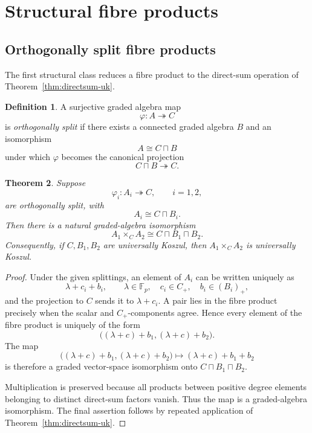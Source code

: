 \documentclass[12pt]{amsart}
\theoremstyle{plain}
\newtheorem{theorem}{Theorem}[section]
\theoremstyle{definition}
\newtheorem{definition}[theorem]{Definition}
\theoremstyle{remark}
\numberwithin{equation}{section}
\newcommand{\Fp}{\mathbb{F}_p}
\begin{document}
\section{Structural fibre products}
\label{sec:structural}

\subsection{Orthogonally split fibre products}

The first structural class reduces a fibre product to the direct-sum
operation of Theorem~\ref{thm:directsum-uk}.

\begin{definition}
\label{def:orthsplit}
A surjective graded algebra map
\[
\varphi:A\twoheadrightarrow C
\]
is \emph{orthogonally split} if there exists a connected graded algebra
\(B\) and an isomorphism
\[
A\cong C\sqcap B
\]
under which \(\varphi\) becomes the canonical projection
\[
C\sqcap B\twoheadrightarrow C.
\]
\end{definition}

\begin{theorem}
\label{thm:orthsplit}
Suppose
\[
\varphi_i:A_i\twoheadrightarrow C,\qquad i=1,2,
\]
are orthogonally split, with
\[
A_i\cong C\sqcap B_i.
\]
Then there is a natural graded-algebra isomorphism
\[
A_1\times_C A_2
\cong
C\sqcap B_1\sqcap B_2.
\]
Consequently, if \(C,B_1,B_2\) are universally Koszul, then
\(A_1\times_C A_2\) is universally Koszul.
\end{theorem}

\begin{proof}
Under the given splittings, an element of \(A_i\) can be written
uniquely as
\[
\lambda+c_i+b_i,
\qquad
\lambda\in\Fp,\quad c_i\in C_+,\quad b_i\in(B_i)_+,
\]
and the projection to \(C\) sends it to \(\lambda+c_i\). A pair lies
in the fibre product precisely when the scalar and \(C_+\)-components
agree. Hence every element of the fibre product is uniquely of the
form
\[
\bigl((\lambda+c)+b_1,(\lambda+c)+b_2\bigr).
\]
The map
\[
\bigl((\lambda+c)+b_1,(\lambda+c)+b_2\bigr)
\longmapsto
(\lambda+c)+b_1+b_2
\]
is therefore a graded vector-space isomorphism onto
\(C\sqcap B_1\sqcap B_2\).

Multiplication is preserved because all products between positive
degree elements belonging to distinct direct-sum factors vanish.
Thus the map is a graded-algebra isomorphism. The final assertion
follows by repeated application of
Theorem~\ref{thm:directsum-uk}.
\end{proof}
\end{document}
